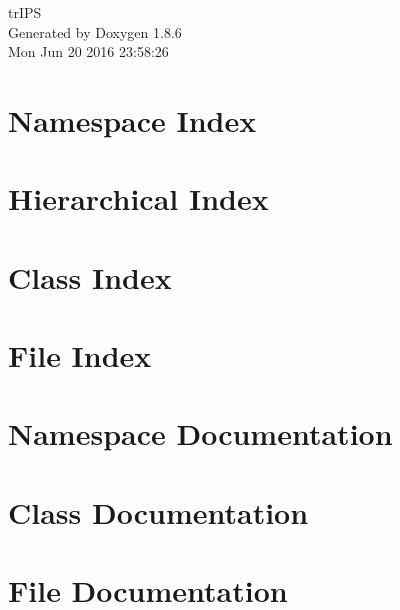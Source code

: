 \documentclass[twoside]{book}
\newcommand{\clearemptydoublepage}{%
  \newpage{\pagestyle{empty}\cleardoublepage}%
}
\begin{document}
\hypersetup{pageanchor=false}
\begin{titlepage}
\vspace*{7cm}
\begin{center}%
{\Large tr\-I\-P\-S }\\
\vspace*{1cm}
{\large Generated by Doxygen 1.8.6}\\
\vspace*{0.5cm}
{\small Mon Jun 20 2016 23:58:26}\\
\end{center}
\end{titlepage}
\clearemptydoublepage
\tableofcontents
\clearemptydoublepage
{}
\hypersetup{pageanchor=true}

\chapter{Namespace Index}

\chapter{Hierarchical Index}

\chapter{Class Index}

\chapter{File Index}

\chapter{Namespace Documentation}



\chapter{Class Documentation}












\chapter{File Documentation}








\newpage
{}
{}
\printindex
\end{document}
